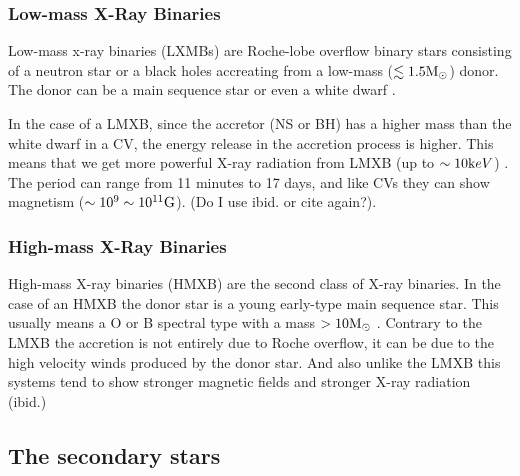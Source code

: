 \subsubsection{Low-mass X-Ray Binaries}

Low-mass x-ray binaries (LXMBs) are Roche-lobe overflow binary stars consisting of a neutron star or a black holes accreating from a low-mass ($\lesssim 1.5 \text M_\odot$) donor. The donor can be a main sequence star or even a white dwarf \citep{tauris_formation_2006}.

In the case of a LMXB, since the accretor (NS or BH) has a higher mass than the white dwarf in a CV, the energy release in the accretion process is higher. This means that we get more powerful X-ray radiation from LMXB (up to $\sim 10 \text keV$) \citep{tauris_formation_2006}. The period can range from 11 minutes to 17 days, and like CVs they can show magnetism ($\sim 10^9 \sim 10^{11} \text G$). (Do I use ibid. or cite again?). 


\subsubsection{High-mass X-Ray Binaries}

High-mass X-ray binaries (HMXB) are the second class of X-ray binaries. In the case of an HMXB the donor star is a young early-type main sequence star. This usually means a O or B spectral type with a mass $> 10 \text M _\odot$ \citep{tauris_formation_2006}. Contrary to the LMXB the accretion is not entirely due to Roche overflow, it can be due to the high velocity winds produced by the donor star. And also unlike the LMXB this systems tend to show stronger magnetic fields and stronger X-ray radiation (ibid.)

\subsection{The secondary stars}

